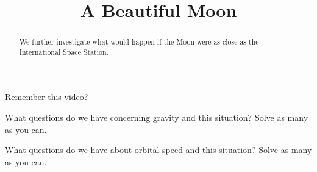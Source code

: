 \documentclass[handout,nonumbers,space]{ximera}
\title{A Beautiful Moon}
\begin{document}
\begin{abstract}
We further investigate what would happen if the Moon were as close as the
International Space Station.
\end{abstract}
\maketitle
Remember this video?


\begin{problem}
What questions do we have concerning gravity and this situation? Solve
as many as you can.
\begin{freeResponse}
\end{freeResponse}
\end{problem}

\begin{problem}
What questions do we have about orbital speed and this situation?
Solve as many as you can.
\begin{freeResponse}
\end{freeResponse}
\end{problem}













\end{document}
